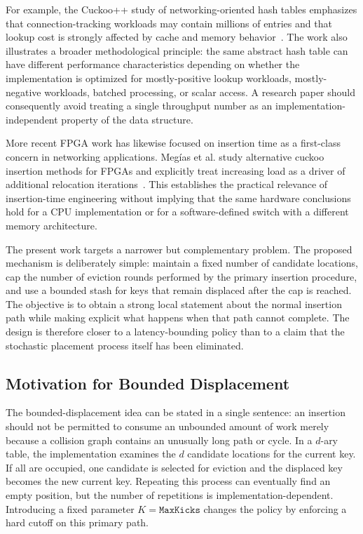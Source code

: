 \documentclass[conference]{IEEEtran}
\begin{document}
For example, the Cuckoo++ study of networking-oriented hash tables emphasizes that connection-tracking workloads may contain millions of entries and that lookup cost is strongly affected by cache and memory behavior~\cite{lescouarnec2018cuckoopp}. The work also illustrates a broader methodological principle: the same abstract hash table can have different performance characteristics depending on whether the implementation is optimized for mostly-positive lookup workloads, mostly-negative workloads, batched processing, or scalar access. A research paper should consequently avoid treating a single throughput number as an implementation-independent property of the data structure.

More recent FPGA work has likewise focused on insertion time as a first-class concern in networking applications. Meg\'ias et al. study alternative cuckoo insertion methods for FPGAs and explicitly treat increasing load as a driver of additional relocation iterations~\cite{megias2025minimizing}. This establishes the practical relevance of insertion-time engineering without implying that the same hardware conclusions hold for a CPU implementation or for a software-defined switch with a different memory architecture.

The present work targets a narrower but complementary problem. The proposed mechanism is deliberately simple: maintain a fixed number of candidate locations, cap the number of eviction rounds performed by the primary insertion procedure, and use a bounded stash for keys that remain displaced after the cap is reached. The objective is to obtain a strong local statement about the normal insertion path while making explicit what happens when that path cannot complete. The design is therefore closer to a latency-bounding policy than to a claim that the stochastic placement process itself has been eliminated.

\subsection{Motivation for Bounded Displacement}

The bounded-displacement idea can be stated in a single sentence: an insertion should not be permitted to consume an unbounded amount of work merely because a collision graph contains an unusually long path or cycle. In a $d$-ary table, the implementation examines the $d$ candidate locations for the current key. If all are occupied, one candidate is selected for eviction and the displaced key becomes the new current key. Repeating this process can eventually find an empty position, but the number of repetitions is implementation-dependent. Introducing a fixed parameter $K=\mathtt{MaxKicks}$ changes the policy by enforcing a hard cutoff on this primary path.
\end{document}
